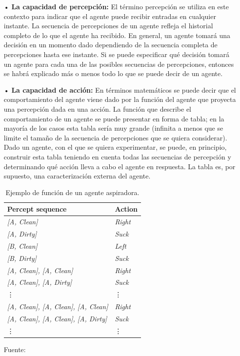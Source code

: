 \begin{itemize}
\item[•] {\bf La capacidad de percepción:}
\vskip 0.1cm El término percepción se utiliza en este contexto para indicar que el agente puede recibir entradas en cualquier instante. La secuencia de percepciones de un agente refleja el historial completo de lo que el agente ha recibido. En general, un agente tomará una decisión en un momento dado dependiendo de la secuencia completa de percepciones hasta ese instante. Si se puede especificar qué decisión tomará un agente para cada una de las posibles secuencias de percepciones, entonces se habrá explicado más o menos todo lo que se puede decir de un agente.

\item[•] {\bf La capacidad de acción:}
\vskip 0.1cm En términos matemáticos se puede decir que el comportamiento del agente viene dado por la función del agente que proyecta una percepción dada en una acción. La función que describe el comportamiento de un agente se puede presentar en forma de tabla; en la mayoría de los casos esta tabla sería muy grande (infinita a menos que se limite el tamaño de la secuencia de percepciones que se quiera considerar). Dado un agente, con el que se quiera experimentar, se puede, en principio, construir esta tabla teniendo en cuenta todas las secuencias de percepción y determinando qué acción lleva a cabo el agente en respuesta. La tabla es, por supuesto, una caracterización externa del agente. 

\begin{table}[ht!]
\centering
\caption{Ejemplo de función de un agente aspiradora.} \vskip 0.1cm
\begin{tabular}{|l|l|}  \hline 
Percept sequence & Action \\ \hline 
\it [A, Clean] & \it Right \\ \it [A, Dirty] & \it Suck \\ \it [B, Clean] & \it Left \\ \it [B, Dirty] & \it Suck \\ \it [A, Clean], \it [A, Clean] & \it Right \\ \it [A, Clean], \it [A, Dirty] & \it Suck \\ \vdots & \vdots \\ \it [A, Clean], \it[A, Clean], \it[A, Clean] & \it Right \\ \it [A, Clean], \it[A, Clean], \it[A, Dirty] & \it Suck \\ \vdots & \vdots \\ \hline
\end{tabular} 
\begin{center}
{\small{Fuente: \cite{Russel}}}
\end{center}
\end{table}


\end{itemize}
